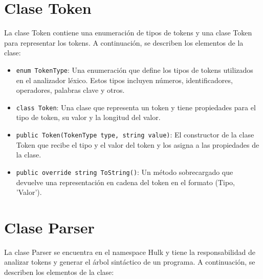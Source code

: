 \documentclass{article}
\begin{document}
\section{Clase \textcolor{classcolor}{Token}}
La clase \textcolor{classcolor}{Token} contiene una enumeración de tipos de tokens y una clase \textcolor{classcolor}{Token} para representar los tokens. A continuación, se describen los elementos de la clase:

\begin{itemize}[left=0pt]
    \item \textcolor{fieldcolor}{\lstinline{enum TokenType}}: Una enumeración que define los tipos de tokens utilizados en el analizador léxico. Estos tipos incluyen números, identificadores, operadores, palabras clave y otros.

    \item \textcolor{classcolor}{\lstinline{class Token}}: Una clase que representa un token y tiene propiedades para el tipo de token, su valor y la longitud del valor.

    \item \textcolor{constructorcolor}{\lstinline{public Token(TokenType type, string value)}}: El constructor de la clase \textcolor{classcolor}{Token} que recibe el tipo y el valor del token y los asigna a las propiedades de la clase.

    \item \textcolor{methodcolor}{\lstinline{public override string ToString()}}: Un método sobrecargado que devuelve una representación en cadena del token en el formato \textcolor{methodcolor}{(Tipo, 'Valor')}.

\end{itemize}

\section{Clase \textcolor{classcolor}{Parser}}
La clase \textcolor{classcolor}{Parser} se encuentra en el namespace \textcolor{classcolor}{Hulk} y tiene la responsabilidad de analizar tokens y generar el árbol sintáctico de un programa. A continuación, se describen los elementos de la clase:
\end{document}
